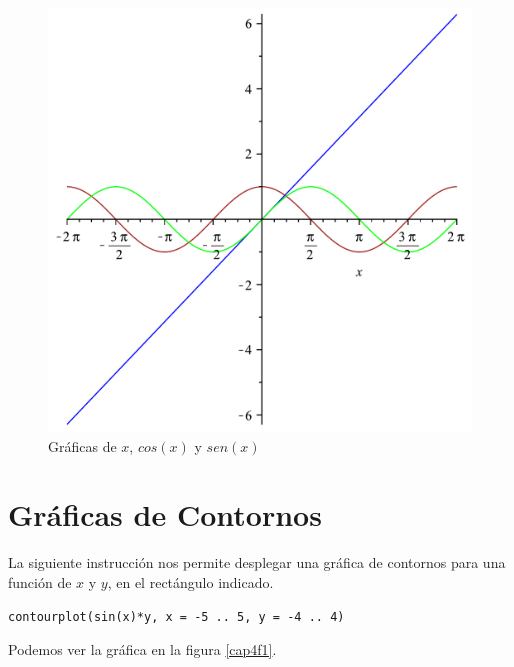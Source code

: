 \documentclass[letterpaper,12pt]{book}
\begin{document}
\begin{figure}[h!]
\centering
\includegraphics[scale=0.35]{grafica05.pdf}
\caption{Gráficas de $x$, $cos(x)$ y $sen(x)$}\label{cap3f1}
\end{figure}

\chapter{Gráficas de Contornos}

La siguiente instrucción nos permite desplegar una gráfica de contornos para una función de
$x$ y $y$, en el rectángulo indicado.

\begin{verbatim}
contourplot(sin(x)*y, x = -5 .. 5, y = -4 .. 4)
\end{verbatim}

Podemos ver la gráfica en la figura \ref{cap4f1}.
\end{document}
